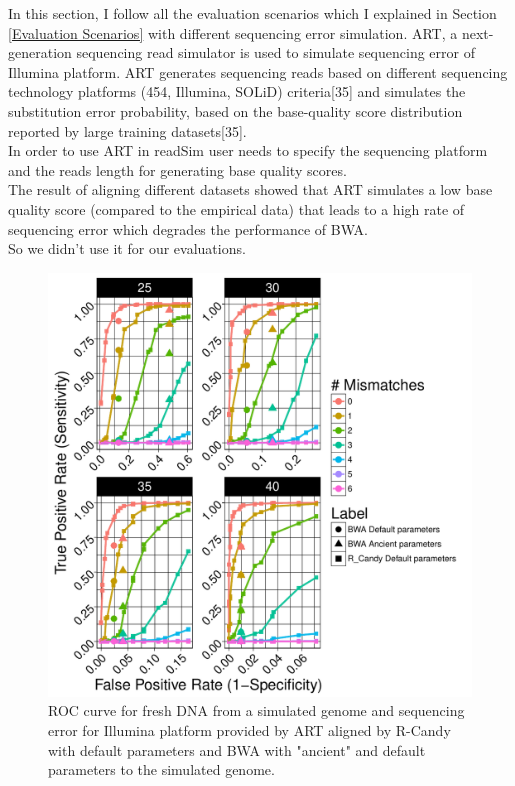 \documentclass[11pt,a4paper]{report}
\begin{document}
In this section, I follow all the evaluation scenarios which I explained in
Section \ref{Evaluation Scenarios}  with different sequencing error simulation.
ART, a next-generation sequencing read simulator is used to simulate sequencing
error of Illumina platform. 
ART generates sequencing reads based on different sequencing technology 
platforms (454, Illumina, SOLiD) criteria[35] and simulates the
substitution error probability, based on the base-quality 
score distribution reported by large training datasets[35].\\

In order to use ART in readSim user needs to specify the sequencing
platform and the reads length for generating base quality scores.\\

The result of aligning different datasets showed that ART simulates a
low base quality score (compared to the empirical data) that leads to 
a high rate of sequencing error which degrades the performance of BWA.\\

So we didn't use it for our evaluations. \\

\begin{figure}[H]
\centering
\includegraphics[width=12cm]{pictures/bROC_DS3_ART.pdf}
\caption{ROC curve for fresh DNA from a simulated genome and sequencing error 
for Illumina platform provided by ART aligned by 
R-Candy with default parameters and BWA with "ancient" and default parameters
to the simulated genome.}
\label{DS3_ART}
\end{figure}
\end{document}
